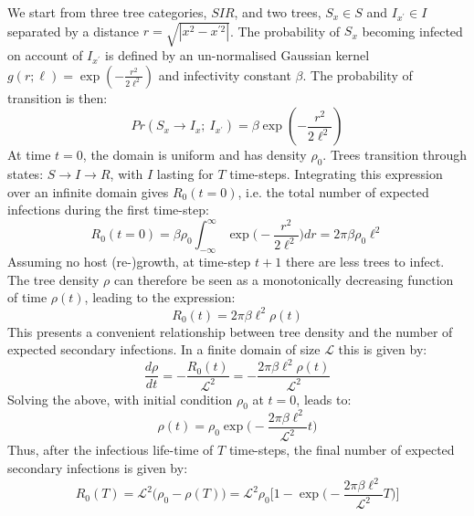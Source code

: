 \label{section:apendix_A}
We start from three tree categories, $SIR$, and two trees, $S_x\in S$ and $I_{x^\prime}\in I$ separated by a distance $r=\sqrt{|x^2-x^{\prime 2}|}$. The probability of $S_x$ becoming infected on account of $I_{x^\prime}$ is defined by an un-normalised Gaussian kernel $g(r; \ell) = \exp(-\frac{r^2}{2\ell^2})$ and infectivity constant $\beta$. The probability of transition is then:
\begin{equation}
\label{eq:Appendix_pr_trans}
     Pr(S_x\rightarrow I_x;\ I_{x^\prime}) = \beta \exp(-\frac{r^2}{2\ell^2})
\end{equation}
At time $t=0$, the domain is uniform and has density $\rho_0$. Trees transition through states: $S\rightarrow I\rightarrow R$, with $I$ lasting for $T$ time-steps. Integrating this expression over an infinite domain gives $R_0(t=0)$, i.e. the total number of expected infections during the first time-step:
\begin{equation}
    R_0(t = 0) = \beta \rho_0 \int^{\infty}_{-\infty} \exp\Big(-\frac{r^2}{2\ell^2}\Big)dr= 2\pi\beta\rho_0\ell^2
\end{equation}{} 
Assuming no host (re-)growth, at time-step $t+1$ there are less trees to infect. The tree density $\rho$ can therefore be seen as a monotonically decreasing function of time $\rho(t)$, leading to the expression:
\begin{equation}
    R_0(t) = 2\pi\beta\ell^2\rho(t)
    \label{eq:r0-A}
\end{equation}{}
This presents a convenient relationship between tree density and the number of expected secondary infections. In a finite domain of size $\mathcal{L}$ this is given by:
\begin{equation}
    \frac{d\rho}{dt} = - \frac{R_0(t)}{\mathcal{L}^2} = -\frac{2\pi\beta\ell^2\rho(t)}{\mathcal{L}^2}
\end{equation}
Solving the above, with initial condition $\rho_0$ at $t=0$, leads to:
\begin{equation}
    \rho(t) = \rho_0 \exp\Big(-\frac{2\pi\beta\ell^2}{\mathcal{L}^2} t \Big)
\end{equation}
Thus, after the infectious life-time of $T$ time-steps, the final number of expected secondary infections is given by:
\begin{equation}
\label{eq:Appendix_final_r0_approx}
    R_0(T) =  \mathcal{L}^2\big(\rho_0 - \rho(T)\big) = \mathcal{L}^2\rho_0\Big[1 - \exp\big(-\frac{2\pi\beta\ell^2}{\mathcal{L}^2} T \big) \Big]
\end{equation}
